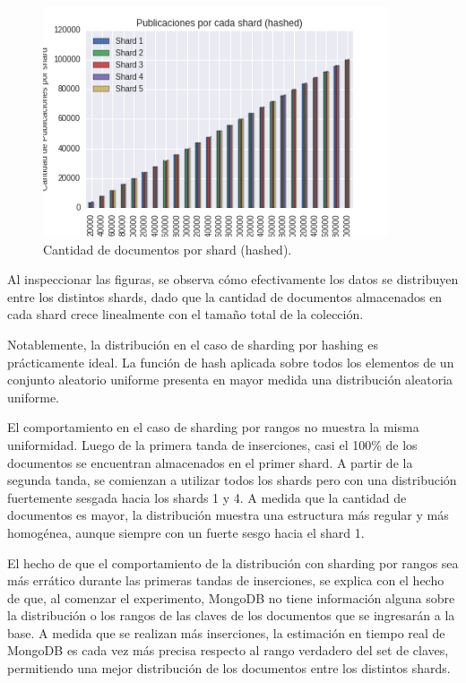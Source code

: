 \begin{figure}[h!]
  \centering
  \includegraphics[width=4in]{imagenes/publicaciones_by_shard_hashed.png}
  \caption{Cantidad de documentos por shard (hashed).}
  \label{fig:publicaciones-hashed}
\end{figure}

Al inspeccionar las figuras, se observa cómo efectivamente los datos se distribuyen entre los distintos shards, dado que la cantidad de documentos almacenados en cada shard crece linealmente con el tamaño total de la colección.

Notablemente, la distribución en el caso de sharding por hashing es prácticamente ideal. La función de hash aplicada sobre todos los elementos de un conjunto aleatorio uniforme presenta en mayor medida una distribución aleatoria uniforme.

El comportamiento en el caso de sharding por rangos no muestra la misma uniformidad. Luego de la primera tanda de inserciones, casi el 100\% de los documentos se encuentran almacenados en el primer shard. A partir de la segunda tanda, se comienzan a utilizar todos los shards pero con una distribución fuertemente sesgada hacia los shards 1 y 4. A medida que la cantidad de documentos es mayor, la distribución muestra una estructura más regular y más homogénea, aunque siempre con un fuerte sesgo hacia el shard 1.

El hecho de que el comportamiento de la distribución con sharding por rangos sea más errático durante las primeras tandas de inserciones, se explica con el hecho de que, al comenzar el experimento, MongoDB no tiene información alguna sobre la distribución o los rangos de las claves de los documentos que se ingresarán a la base. A medida que se realizan más inserciones, la estimación en tiempo real de MongoDB es cada vez más precisa respecto al rango verdadero del set de claves, permitiendo una mejor distribución de los documentos entre los distintos shards.
